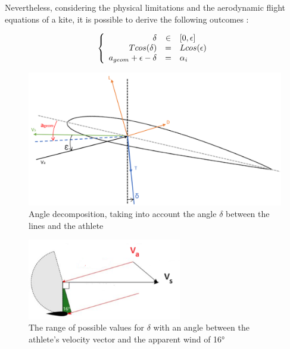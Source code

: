 Nevertheless, considering the physical limitations and the aerodynamic flight equations of a kite, it is possible to derive the following outcomes :

\begin{equation}
\left \{
   \begin{array}{r c l}
      \delta  & \in & [0, \epsilon] \\
      Tcos(\delta)   & = & Lcos(\epsilon) \\
      a_{geom} + \epsilon - \delta & = & \alpha_{i}
   \end{array}
   \right .
   \label{new angles}
\end{equation}

\begin{figure}[H]
    \centering
    \includegraphics[width=1\textwidth]{figures/2D steady simulations/Angle calcul.png}
    \caption{Angle decomposition, taking into account the angle $\delta$ between the lines and the athlete}
    \label{fig:Angle decomposition, taking into account the angle $\delta$ between the lines and the athlete}
\end{figure}

\begin{figure}[H]
    \centering
    \includegraphics[width=0.6\textwidth]{figures/2D steady simulations/Ifremer work.png}
    \caption{The range of possible values for $\delta$ with an angle between the athlete's velocity vector and the apparent wind of 16°}
    \label{fig:The range of possible values for epsilon for an angle between the athlete's velocity vector and the apparent wind of 16°}
\end{figure}

